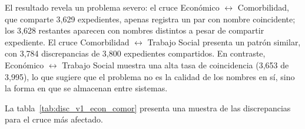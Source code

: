 \begin{table}[H]
\centering
\caption{Vinculación entre bases --- normalización básica}
\label{tab:vinculacion_basica}
\end{table}



El resultado revela un problema severo: el cruce Económico $\leftrightarrow$ Comorbilidad, que comparte 3,629 expedientes, apenas registra un par con nombre coincidente; los 3,628 restantes aparecen con nombres distintos a pesar de compartir expediente. El cruce Comorbilidad $\leftrightarrow$ Trabajo Social presenta un patrón similar, con 3,784 discrepancias de 3,800 expedientes compartidos. En contraste, Económico $\leftrightarrow$ Trabajo Social muestra una alta tasa de coincidencia (3,653 de 3,995), lo que sugiere que el problema no es la calidad de los nombres en sí, sino la forma en que se almacenan entre sistemas.

La tabla~\ref{tab:disc_v1_econ_comor} presenta una muestra de las discrepancias para el cruce más afectado.

